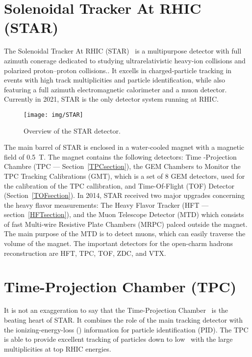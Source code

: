 \section{Solenoidal Tracker At RHIC (STAR)}

The Solenoidal Tracker At RHIC (STAR)~\cite{STARoverview} is a multipurpose detector with full azimuth conerage dedicated to
studying ultrarelativistic heavy-ion collisions and polarized proton--proton collisions.. It excells in charged-particle tracking in events with high track multiplicities and particle identification, while also featuring a full azimuth electromagnetic calorimeter and a muon detector. Currently in 2021, STAR is the
only detector system running at RHIC\@.


\begin{figure}[htb]
\begin{center}
 \texttt{[image: img/STAR]}\\
\end{center}
\caption{\label{STAR}Overview of the STAR detector.}
\end{figure}


The main barrel of STAR is enclosed in a water-cooled magnet with a magnetic field of \SI{0.5}{\tesla}. The magnet contains the
following detectors: Time -Projection Chambre (TPC --- Section~\ref{TPCsection}), the GEM
Chambers to Monitor the TPC Tracking Calibrations (GMT), 
which is a set of 8 GEM detectors, used for the calibration of the TPC callibration, and Time-Of-Flight
(TOF) Detector (Section~\ref{TOFsection}). In 2014, STAR received two major upgrades
concerning the heavy flavor measurements: The Heavy Flavor Tracker (HFT --- section~\ref{HFTsection}), and the Muon Telescope Detector (MTD) which consists of fast Multi-wire Resistive Plate Chambers (MRPC) palced
outside the magnet. The main purpose of the MTD is to detect muons, which can easily traverse the volume of the magnet. The important
detectors for the open-charm hadrons reconstruction are HFT, TPC, TOF, ZDC, and VTX\@.

\section{Time-Projection Chamber (TPC)\label{TPCsection}} 
It is not an exaggeration to say that the Time-Projection Chamber~\cite{TpcNim} is the beating heart of STAR. It combines the role of the main tracking detector with the ionizing-energy-loss
(\dedx) information for particle identification (PID). The TPC is able to provide excellent tracking of particles down to low \pt\ with the large multiplicities at top RHIC energies.


